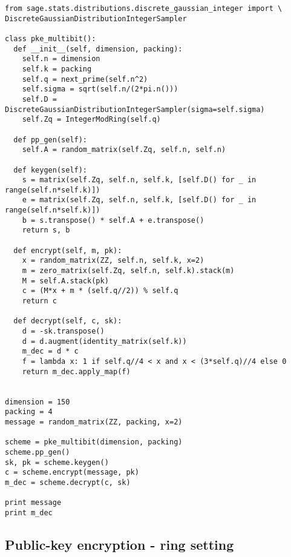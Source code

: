 \documentclass[10pt,a4paper,nobib]{tufte-handout}
\begin{document}
\lstset{language=sage,label= ,caption= ,captionpos=b,numbers=none}
\begin{lstlisting}
from sage.stats.distributions.discrete_gaussian_integer import \
DiscreteGaussianDistributionIntegerSampler

class pke_multibit():
  def __init__(self, dimension, packing):
    self.n = dimension
    self.k = packing
    self.q = next_prime(self.n^2)
    self.sigma = sqrt(self.n/(2*pi.n()))
    self.D = DiscreteGaussianDistributionIntegerSampler(sigma=self.sigma)
    self.Zq = IntegerModRing(self.q)

  def pp_gen(self):
    self.A = random_matrix(self.Zq, self.n, self.n)

  def keygen(self):
    s = matrix(self.Zq, self.n, self.k, [self.D() for _ in range(self.n*self.k)])
    e = matrix(self.Zq, self.n, self.k, [self.D() for _ in range(self.n*self.k)])
    b = s.transpose() * self.A + e.transpose()
    return s, b

  def encrypt(self, m, pk):
    x = random_matrix(ZZ, self.n, self.k, x=2)
    m = zero_matrix(self.Zq, self.n, self.k).stack(m)
    M = self.A.stack(pk)
    c = (M*x + m * (self.q//2)) % self.q
    return c

  def decrypt(self, c, sk):
    d = -sk.transpose()
    d = d.augment(identity_matrix(self.k))
    m_dec = d * c
    f = lambda x: 1 if self.q//4 < x and x < (3*self.q)//4 else 0
    return m_dec.apply_map(f)


dimension = 150
packing = 4
message = random_matrix(ZZ, packing, x=2)

scheme = pke_multibit(dimension, packing)
scheme.pp_gen()
sk, pk = scheme.keygen()
c = scheme.encrypt(message, pk)
m_dec = scheme.decrypt(c, sk)

print message
print m_dec
\end{lstlisting}

\subsection{Public-key encryption - ring setting}
\end{document}
